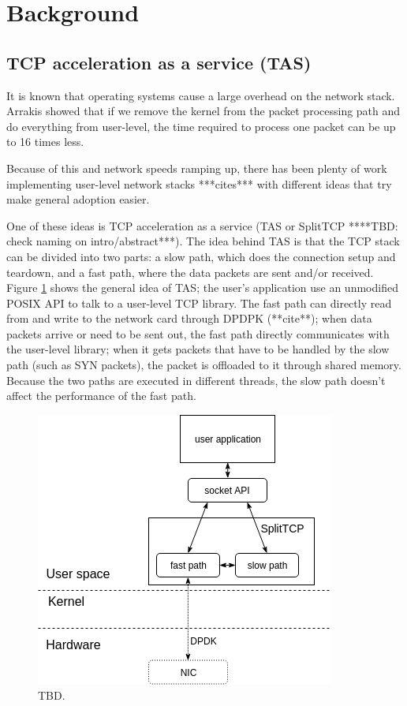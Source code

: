 \section{Background}\label{Background}

%
%

\subsection{TCP acceleration as a service (TAS)}

It is known that operating systems cause a large overhead on the network
stack. Arrakis \cite{peter:arrakis} showed that if we remove the kernel
from the packet processing path and do everything from user-level, the time 
required to process one packet can be up to 16 times less.

Because of this and network speeds ramping up, there has been plenty of work implementing
user-level network stacks ***cites*** with different ideas that try make general adoption
easier.

One of these ideas is TCP acceleration as a service (TAS or SplitTCP  ****TBD: check naming on intro/abstract***).
The idea behind TAS is that the TCP stack can be divided into two parts: a slow path, which does the connection
setup and teardown, and a fast path, where the data packets are sent and/or received. Figure \ref{fig:splittcp} 
shows the general idea of TAS; the user's application use an unmodified POSIX API to talk to a user-level TCP
library. The fast path can directly read from and write to the network card through DPDPK (**cite**); when data packets
arrive or need to be sent out, the fast path directly communicates with the user-level library;
when it gets packets that have to be handled by the slow path (such as SYN packets), the packet 
is offloaded to it through shared memory. Because the two paths are executed in different threads, the slow path doesn't
affect the performance of the fast path.


\begin{figure}
\centering
\includegraphics[width=0.7\columnwidth]{figures/splittcp_default.png}
\caption{TBD.}
\label{fig:splittcp}
\end{figure}


